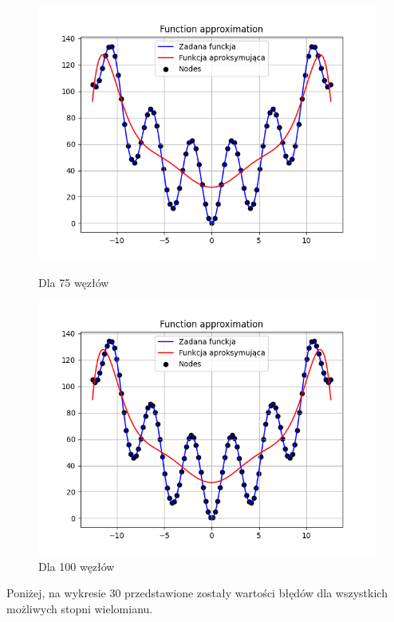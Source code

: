 \documentclass{article}
\begin{document}
\begin{figure}[H]
\begin{minipage}[b]{0.49\textwidth}
    \begin{minipage}[b]{\textwidth}
      \includegraphics[width=\textwidth]{img30.png}
      \caption{Dla 75 węzłów}
    \end{minipage}
    \vspace*{\fill}
    \begin{minipage}[b]{\textwidth}
      \includegraphics[width=\textwidth]{img31.png}
      \caption{Dla 100 węzłów}
    \end{minipage}
  \end{minipage}
\end{figure}

Poniżej, na wykresie 30 przedstawione zostały wartości błędów dla wszystkich możliwych stopni wielomianu.
\end{document}
